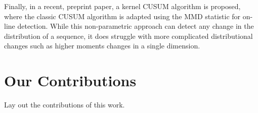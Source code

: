 Finally, in a recent, preprint paper, a kernel CUSUM algorithm is proposed, where the classic CUSUM algorithm is adapted using the MMD statistic for on-line detection. While this non-parametric approach can detect any change in the distribution of a sequence, it does struggle with more complicated distributional changes such as higher moments changes in a single dimension.

 

\section{Our Contributions}
Lay out the contributions of this work.